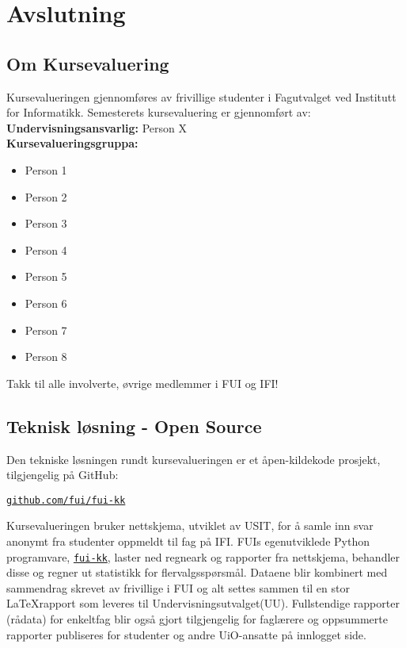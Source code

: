 \chapter{Avslutning}
\label{chp:end}
\newpage

\section{Om Kursevaluering}
Kursevalueringen gjennomføres av frivillige studenter i Fagutvalget ved Institutt for Informatikk.
Semesterets kursevaluering er gjennomført av:\\

\textbf{Undervisningsansvarlig:} Person X\\

\textbf{Kursevalueringsgruppa:}
\begin{itemize}[label={}]
\item Person 1
\item Person 2
\item Person 3
\item Person 4
\item Person 5
\item Person 6
\item Person 7
\item Person 8
\end{itemize}

Takk til alle involverte, øvrige medlemmer i FUI og IFI!

\section{Teknisk løsning - Open Source}
\label{sec:OS}
Den tekniske løsningen rundt kursevalueringen er et åpen-kildekode prosjekt, tilgjengelig på GitHub:
\begin{center}
\href{https://github.com/fui/fui-kk}{\texttt{github.com/fui/fui-kk}}
\end{center}

Kursevalueringen bruker nettskjema, utviklet av USIT, for å samle inn svar anonymt fra studenter oppmeldt til fag på IFI. FUIs egenutviklede Python programvare, \href{https://github.com/fui/fui-kk}{\texttt{fui-kk}}, laster ned regneark og rapporter fra nettskjema, behandler disse og regner ut statistikk for flervalgsspørsmål. Dataene blir kombinert med sammendrag skrevet av frivillige i FUI og alt settes sammen til en stor \LaTeX \space rapport som leveres til Undervisningsutvalget(UU). Fullstendige rapporter (rådata) for enkeltfag blir også gjort tilgjengelig for faglærere og oppsummerte rapporter publiseres for studenter og andre UiO-ansatte på innlogget side.
\newpage
